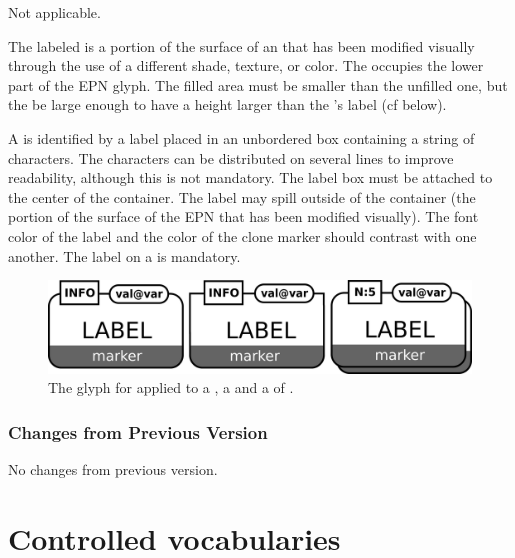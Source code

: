 \begin{glyphDescription}

\glyphSboTerm Not applicable.

\glyphContainer The labeled  is a portion of the surface of an  that has been modified visually through the use of a different shade, texture, or color.  The  occupies the lower part of the EPN glyph. The filled area must be smaller than the unfilled one, but the be large enough to have a height larger than the 's label (cf below).  

\glyphLabel A  is identified by a label placed in an unbordered box containing a string of characters.  The characters can be distributed on several lines to improve readability, although this is not mandatory.  The label box must be attached to the center of the container.  The label may spill outside of the container (the portion of the surface of the EPN that has been modified visually).  The font color of the label and the color of the clone marker should contrast with one another.  The label on a  is mandatory.

\end{glyphDescription}

\begin{figure}[H]
  \centering
  \includegraphics[scale = 0.3]{images/labeledCloneMarker}
  \caption{The \PD glyph for  applied to a , a  and a  of .}
  \label{fig:labeledCloneMarker}
\end{figure}

\subsubsection{Changes from Previous Version}

No changes from previous version.

\section{Controlled vocabularies}\label{sec:CVs}

